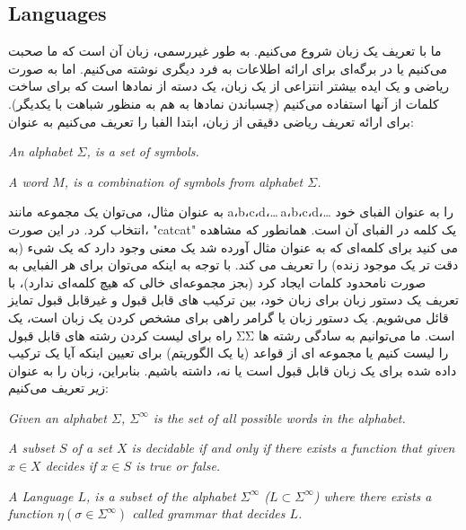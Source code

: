 \documentclass[10pt,a4paper]{article}
\begin{document}
                \subsection{Languages}
ما با تعریف یک زبان شروع می‌کنیم. به طور غیررسمی، زبان آن است که ما صحبت می‌کنیم یا در برگه‌ای برای ارائه اطلاعات به فرد دیگری نوشته می‌کنیم. اما به صورت ریاضی و یک ایده بیشتر انتزاعی از یک زبان، یک دسته از نمادها است که برای ساخت کلمات از آنها استفاده می‌کنیم (چسباندن نمادها به هم به منظور شباهت با یکدیگر). برای ارائه تعریف ریاضی دقیقی از زبان، ابتدا الفبا را تعریف می‌کنیم به عنوان:
                    \begin{define}
                        \textit{An alphabet $\Sigma$, is a set of symbols.}
                    \end{define}
                    \begin{define}
                        \textit{A word $M$, is a combination of symbols from alphabet $\Sigma$.}
                    \end{define}
به عنوان مثال، می‌توان یک مجموعه مانند {a،b،c،d،… }{a،b،c،d،…} را به عنوان الفبای خود انتخاب کرد. در این صورت، "catcat" یک کلمه در الفبای آن است. همانطور که مشاهده می کنید برای کلمه‌ای که به عنوان مثال آورده شد یک معنی وجود دارد که یک شیء (به دقت تر یک موجود زنده) را تعریف می کند. با توجه به اینکه می‌توان برای هر الفبایی به صورت نامحدود کلمات ایجاد کرد (بجز مجموعه‌ای خالی که هیچ کلمه‌ای ندارد)، با تعریف یک دستور زبان برای زبان خود، بین ترکیب های قابل قبول و غیرقابل قبول تمایز قائل می‌شویم. یک دستور زبان یا گرامر راهی برای مشخص کردن یک زبان است، یک راه برای لیست کردن رشته های قابل قبول ΣΣ است. ما می‌توانیم به سادگی رشته ها را لیست کنیم یا مجموعه ای از قواعد (یا یک الگوریتم) برای تعیین اینکه آیا یک ترکیب داده شده برای یک زبان قابل قبول است یا نه، داشته باشیم. بنابراین، زبان را به عنوان زیر تعریف می‌کنیم:
                    \begin{define}
                        \textit{Given an alphabet $\Sigma$, $\Sigma^\infty$ is the set of all possible words in the alphabet.}
                    \end{define}
                    \begin{define}
                        \textit{A subset $S$ of a set $X$ is decidable if and only if there exists a function that given $x\in X$ decides if $x\in S$ is true or false.}
                    \end{define}
                    \begin{define}
                        \textit{A Language $L$, is a subset of the alphabet $\Sigma^\infty$ ($L\subset \Sigma^\infty$) where there exists a function $\eta(\sigma\in\Sigma^\infty)$ called grammar that decides $L$.}
                    \end{define}
\end{document}

